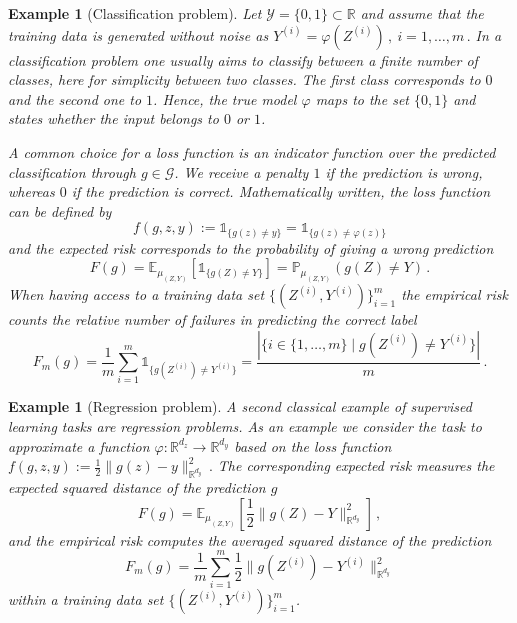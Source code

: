 \documentclass[12pt,openany]{book}
\newtheorem{example}[thm]{Example}
\theoremstyle{definition}
\theoremstyle{definition}
\newcommand{\cG}{\mathcal{G}}
\newcommand{\cY}{\mathcal{Y}}
\newcommand{\E}{\mathbb{E}}
\newcommand{\R}{\mathbb{R}}
\begin{document}
\begin{example}[Classification problem]
    Let $\cY = \{0,1\}\subset \R$ and assume that the training data is generated without noise as
    $Y^{(i)} = \varphi(Z^{(i)})\,,\ i=1,\dots,m\,.$
    In a classification problem one usually aims to classify between a finite number of classes, here for simplicity between two classes. The first class corresponds to $0$ and the second one to $1$. Hence, the true model $\varphi$ maps to the set $\{0,1\}$ and states whether the input belongs to $0$ or $1$. 

    A common choice for a loss function is an indicator function over the predicted classification through $g\in\cG$. We receive a penalty $1$ if the prediction is wrong, whereas $0$ if the prediction is correct. Mathematically written, the loss function can be defined by
    \[f(g,z,y) := \mathds{1}_{\{g(z)\neq y\}} = \mathds{1}_{\{g(z)\neq \varphi(z)\}}\]
    and the expected risk corresponds to the probability of giving a wrong prediction
    \[F(g) = \E_{\mu_{(Z,Y)}}[\mathds{1}_{\{g(Z)\neq Y\}}] = \mathbb P_{\mu_{(Z,Y)}}(g(Z)\neq Y)\,.\]
    When having access to a training data set $\{(Z^{(i)},Y^{(i)})\}_{i=1}^m$ the empirical risk counts the relative number of failures in predicting the correct label
    \[F_m(g) = \frac1m\sum_{i=1}^m \mathds{1}_{\{g(Z^{(i)})\neq Y^{(i)}\}} = \frac{|\{i\in\{1,\dots,m\}\mid g(Z^{(i)})\neq Y^{(i)}\}|}{m}\,.\]
\end{example}

\begin{example}[Regression problem]
    A second classical example of supervised learning tasks are regression problems. As an example we consider the task to approximate a function $\varphi:\R^{d_z}\to\R^{d_y}$ based on the loss function 
    \( f(g,z,y):= \frac12\|g(z)-y\|_{\R^{d_y}}^2\,.\)
    The corresponding expected risk measures the expected squared distance of the prediction $g$
    \[F(g)=\E_{\mu_{(Z,Y)}}[\frac12\|g(Z)-Y\|_{\R^{d_y}}^2]\,,\]
    and the empirical risk computes the averaged squared distance of the prediction 
    \[ F_m(g) = \frac1m\sum_{i=1}^m\frac12\|g(Z^{(i)})-Y^{(i)}\|_{\R^{d_y}}^2\]
    within a training data set $\{(Z^{(i)},Y^{(i)})\}_{i=1}^m$.
\end{example}
\end{document}
